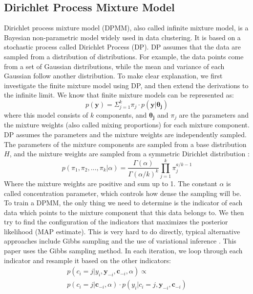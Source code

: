 \documentclass[journal]{IEEEtran}
\begin{document}
\subsection{Dirichlet Process Mixture Model}
Dirichlet process mixture model (DPMM), also called infinite mixture model, is a Bayesian non-parametric model widely used in data clustering. 
It is based on a stochastic process called Dirichlet Process (DP).
DP assumes that the data are sampled from a distribution of distributions. For example, the data points come from a set of Gaussian distributions, while the mean and variance of each Gaussian follow another distribution. 
To make clear explanation, we first investigate the finite mixture model using DP, and then extend the derivations to the infinite limit.
We know that finite mixture models can be represented as:
\begin{equation}
p(\bm{y}) = \Sigma_{j=1}^k \pi_j \cdot p(\bm{y}|\bm{\theta_j})
\label{finite_mixture_model}
\end{equation}
where this model consists of $k$ components, and $\bm{\theta_j}$ and $\pi_j$ are the parameters and the mixture weights (also called mixing proportions) for each mixture component.
DP assumes the parameters and the mixture weights are independently sampled. 
The parameters of the mixture components are sampled from a base distribution $H$, and the mixture weights are sampled from a symmetric Dirichlet distribution \cite{DP}:
 \begin{equation}
p(\pi_1, \pi_2, \dots, \pi_k | \alpha) = 
\frac{\Gamma(\alpha)}{\Gamma(\alpha / k)^k} \prod_{j=1}^k \pi_j^{a/k - 1}
\label{Dirichlet_distribution}
\end{equation}
Where the mixture weights are positive and sum up to 1. The constant $\alpha$ is called concentration parameter, which controls how dense the sampling will be.
To train a DPMM, the only thing we need to determine is the indicator of each data which points to the mixture component that this data belongs to. 
We then try to find the configuration of the indicators that maximizes the posterior likelihood (MAP estimate). 
This is very hard to do directly, typical alternative approaches include Gibbs sampling \cite{Gibbs_sampling, Gibbs} and the use of variational inference \cite{variational_method}.
This paper uses the Gibbs sampling method. 
In each iteration, we loop through each indicator and resample it based on the other indicators:
\begin{equation}
\begin{gathered}
p(c_i = j|y_i, \bm{y}_{-i}, \bm{c}_{-i}, \alpha) 
\propto  \\
p(c_i = j|\bm{c}_{-i}, \alpha) \cdot
p(y_i|c_i = j, \bm{y}_{-i}, \bm{c}_{-i})
\end{gathered}
\label{indicator_posterior}
\end{equation}
\end{document}
